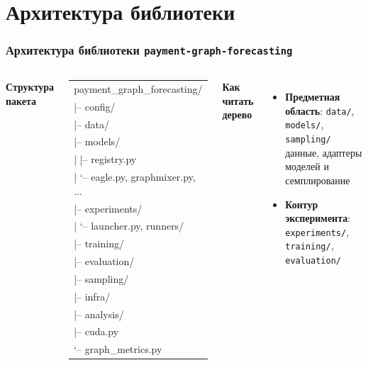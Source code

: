 \documentclass[aspectratio=169]{beamer}
\begin{document}
\section{Архитектура библиотеки}
\begin{frame}
  \frametitle{Архитектура библиотеки \texttt{payment-graph-forecasting}}
  \begin{columns}[T,onlytextwidth]
    {\scriptsize\bfseries Структура пакета}
    \vspace{0.03cm}
    \setlength{\fboxsep}{4pt}
    \noindent\colorbox{gray!8}{%
      \parbox[t][0.64\textheight][t]{\dimexpr\linewidth-2\fboxsep\relax}{%
        \raggedright
        \vspace*{2pt}
        {\fontsize{8.0}{7.5}\selectfont\ttfamily
        \renewcommand{\arraystretch}{1.05}
        \begin{tabular}{@{}l@{}}
        payment\_graph\_forecasting/ \\
        |-- config/ \\
        |-- data/ \\
        |-- models/ \\
        | |-- registry.py \\
        | `-- eagle.py, graphmixer.py, ... \\
        |-- experiments/ \\
        | `-- launcher.py, runners/ \\
        |-- training/ \\
        |-- evaluation/ \\
        |-- sampling/ \\
        |-- infra/ \\
        |-- analysis/ \\
        |-- cuda.py \\
        `-- graph\_metrics.py \\
        \end{tabular}}
      }%
    }
    \scriptsize
    \textbf{Как читать дерево}
    \begin{itemize}
      \setlength{\itemsep}{1pt}
      \item \textbf{Предметная область}: \texttt{data/}, \texttt{models/}, \texttt{sampling/}\\
      данные, адаптеры моделей и семплирование
      \item \textbf{Контур эксперимента}: \texttt{experiments/}, \texttt{training/}, \texttt{evaluation/}\\

\end{itemize}
\end{columns}
\end{frame}
\end{document}
